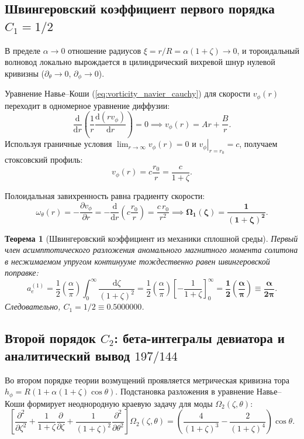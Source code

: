 \documentclass[11pt,a4paper]{article}
\newtheorem{theorem}{Теорема}[section]
\theoremstyle{definition}
\theoremstyle{remark}
\begin{document}
\subsection{Швингеровский коэффициент первого порядка $C_1 = 1/2$}
В пределе $\alpha \to 0$ отношение радиусов $\xi = r/R = \alpha(1+\zeta) \to 0$, и тороидальный волновод локально вырождается в цилиндрический вихревой шнур нулевой кривизны ($\partial_\theta \to 0$, $\partial_\phi \to 0$).

Уравнение Навье--Коши (\ref{eq:vorticity_navier_cauchy}) для скорости $v_\phi(r)$ переходит в одномерное уравнение диффузии:
\begin{equation}
    \frac{\mathrm{d}}{\mathrm{d}r}\left( \frac{1}{r} \frac{\mathrm{d}(r v_\phi)}{\mathrm{d}r} \right) = 0 \implies v_\phi(r) = A r + \frac{B}{r}.
\end{equation}
Используя граничные условия $\lim_{r \to \infty} v_\phi(r) = 0$ и $\left. v_\phi \right|_{r = r_0} = c$, получаем стоксовский профиль:
\begin{equation}
    v_\phi(r) = c \frac{r_0}{r} = \frac{c}{1 + \zeta}.
\end{equation}

Полоидальная завихренность равна градиенту скорости:
\begin{equation}
    \omega_\theta(r) = -\frac{\partial v_\phi}{\partial r} = -\frac{\mathrm{d}}{\mathrm{d}r}\left( c \frac{r_0}{r} \right) = \frac{c \, r_0}{r^2} \implies \boldsymbol{\Omega_1(\zeta) = \frac{1}{(1 + \zeta)^2}}.
\end{equation}

\begin{theorem}[Швингеровский коэффициент из механики сплошной среды]
Первый член асимптотического разложения аномального магнитного момента солитона в несжимаемом упругом континууме тождественно равен швингеровской поправке:
\begin{equation}
    a_e^{(1)} = \frac{1}{2} \left(\frac{\alpha}{\pi}\right) \int_0^\infty \frac{\mathrm{d}\zeta}{(1+\zeta)^2} = \frac{1}{2} \left(\frac{\alpha}{\pi}\right) \left[ -\frac{1}{1+\zeta} \right]_0^\infty = \boldsymbol{\frac{1}{2} \left(\frac{\alpha}{\pi}\right) \equiv \frac{\alpha}{2\pi}}.
    \label{eq:c1_schwinger_proof}
\end{equation}
Следовательно, $C_1 = 1/2 \equiv 0.5000000$.
\end{theorem}

\subsection{Второй порядок $C_2$: бета-интегралы девиатора и аналитический вывод $197/144$}
Во втором порядке теории возмущений проявляется метрическая кривизна тора $h_\phi = R(1 + \alpha(1+\zeta)\cos\theta)$. Подстановка разложения в уравнение Навье--Коши формирует неоднородную краевую задачу для моды $\Omega_2(\zeta, \theta)$:
\begin{equation}
    \left[ \frac{\partial^2}{\partial \zeta^2} + \frac{1}{1+\zeta}\frac{\partial}{\partial \zeta} + \frac{1}{(1+\zeta)^2}\frac{\partial^2}{\partial \theta^2} \right] \Omega_2(\zeta, \theta) = \left( \frac{4}{(1+\zeta)^3} - \frac{2}{(1+\zeta)^4} \right) \cos\theta.
\end{equation}
\end{document}
